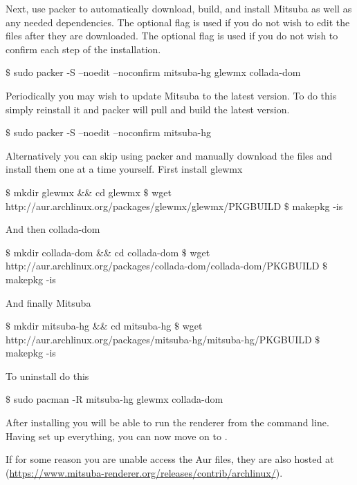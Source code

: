 Next, use packer to automatically download, build, and install Mitsuba as well as any needed dependencies.
The optional  flag is used if you do not wish to edit the files after they are downloaded.
The optional  flag is used if you do not wish to confirm each step of the installation. 
\begin{shell}
$\text{\$}$ sudo packer -S --noedit --noconfirm mitsuba-hg glewmx collada-dom
\end{shell}

Periodically you may wish to update Mitsuba to the latest version.
To do this simply reinstall it and packer will pull and build the latest version.
\begin{shell}
$\text{\$}$ sudo packer -S --noedit --noconfirm mitsuba-hg
\end{shell}

Alternatively you can skip using packer and manually download the files and install them one at a time yourself.
First install glewmx
\begin{shell}
$\text{\$}$ mkdir glewmx && cd glewmx
$\text{\$}$ wget http://aur.archlinux.org/packages/glewmx/glewmx/PKGBUILD
$\text{\$}$ makepkg -is
\end{shell}

And then collada-dom
\begin{shell}
$\text{\$}$ mkdir collada-dom && cd collada-dom
$\text{\$}$ wget http://aur.archlinux.org/packages/collada-dom/collada-dom/PKGBUILD
$\text{\$}$ makepkg -is
\end{shell}

And finally Mitsuba
\begin{shell}
$\text{\$}$ mkdir mitsuba-hg && cd mitsuba-hg
$\text{\$}$ wget http://aur.archlinux.org/packages/mitsuba-hg/mitsuba-hg/PKGBUILD
$\text{\$}$ makepkg -is
\end{shell}

To uninstall do this
\begin{shell}
$\text{\$}$ sudo pacman -R mitsuba-hg glewmx collada-dom
\end{shell}
After installing you will be able to run the renderer from the command line.
Having set up everything, you can now move on to .

If for some reason you are unable access the Aur files, they are also hosted at 
(\url{https://www.mitsuba-renderer.org/releases/contrib/archlinux/}).


